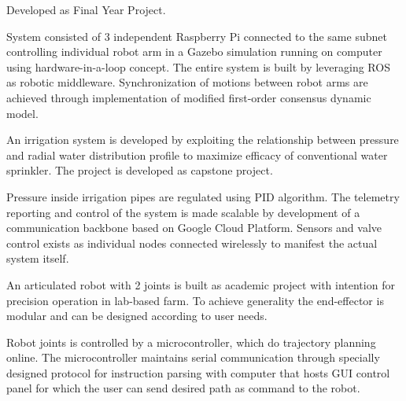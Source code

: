 \documentclass[letterpaper]{deedy-resume} %
\begin{document}
\begin{minipage}[t]{0.66\textwidth}
\vspace{\topsep}
\begin{tightitemize}
\item Developed as Final Year Project.
\item System consisted of 3 independent Raspberry Pi connected to the same subnet controlling individual robot arm in a Gazebo simulation running on computer using hardware-in-a-loop concept. 
The entire system is built by leveraging ROS as robotic middleware. 
Synchronization of motions between robot arms are achieved through implementation of modified first-order consensus dynamic model.
\end{tightitemize} 
\sectionspace %

\vspace{\topsep}
\begin{tightitemize}
\item An irrigation system is developed by exploiting the relationship between pressure and radial water distribution profile to maximize efficacy of conventional water sprinkler. 
The project is developed as capstone project.
\item Pressure inside irrigation pipes are regulated using PID algorithm. 
The telemetry reporting and control of the system is made scalable by development of a communication backbone based on Google Cloud Platform.
Sensors and valve control exists as individual nodes connected wirelessly to manifest the actual system itself.
\end{tightitemize} 
\sectionspace %

\vspace{\topsep}
\begin{tightitemize}
\item An articulated robot with 2 joints is built as academic project with intention for precision operation in lab-based farm. To achieve generality the end-effector is modular and can be designed according to user needs.
\item Robot joints is controlled by a microcontroller, which do trajectory planning online. 
The microcontroller maintains serial communication through specially designed protocol for instruction parsing with computer that hosts GUI control panel for which the user can send desired path as command to the robot.
\end{tightitemize} 
\sectionspace %

\end{minipage} %
\end{document}
